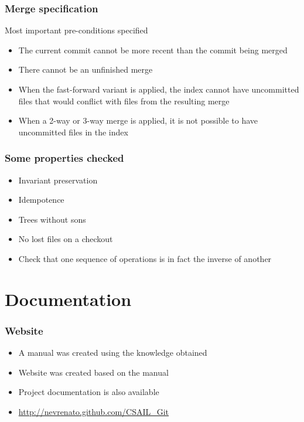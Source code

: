 \documentclass{beamer}
\begin{document}
\begin{frame}[fragile]
	\frametitle{Merge specification}
	\begin{block}{Most important pre-conditions specified}
	\begin{itemize}
		\item The current commit cannot be more recent than the commit
		being merged
		\item There cannot be an unfinished merge
		\item When the fast-forward variant is applied, the index cannot have
		uncommitted files that would conflict with files from the 
		resulting merge
		\item When a 2-way or 3-way merge is applied, it is not possible
		to have uncommitted files in the index
	\end{itemize}
	\end{block}


\end{frame}

\begin{frame}
	\frametitle{Some properties checked}

	\begin{itemize}
		\item Invariant preservation 
		\item Idempotence
		\item Trees without sons
		\item No lost files on a checkout
		\item Check that one sequence of operations is in fact the
		inverse of another
	\end{itemize}
\end{frame}
\section{Documentation}

\begin{frame}
	\frametitle{Website}
	\begin{itemize}
	\item A manual was created using the knowledge obtained
	\item Website was created based on the manual 
	\item Project documentation is also available
	\item \url{http://nevrenato.github.com/CSAIL\_Git}
	\end{itemize}

\end{frame}
\end{document}
